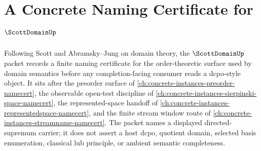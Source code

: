 \chapter{A Concrete Naming Certificate for $\ScottDomainUp$}
\label{ch:concrete-instances-scott-domain-namecert}

Following Scott and Abramsky--Jung on domain theory, the $\ScottDomainUp$ packet records a finite naming certificate for the order-theoretic surface used by domain semantics before any completion-facing consumer reads a dcpo-style object. It sits after the preorder surface of \autoref{ch:concrete-instances-preorder-namecert}, the observable open-test discipline of \autoref{ch:concrete-instances-sierpinski-space-namecert}, the represented-space handoff of \autoref{ch:concrete-instances-representedspace-namecert}, and the finite stream window route of \autoref{ch:concrete-instances-streamname-namecert}. The packet names a displayed directed-supremum carrier; it does not assert a host dcpo, quotient domain, selected basis enumeration, classical lub principle, or ambient semantic completeness.

